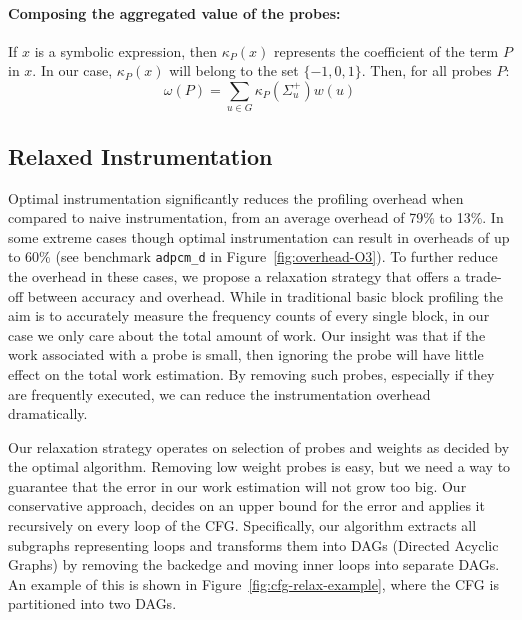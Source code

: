 \paragraph{Composing the aggregated value of the probes:}
If $x$ is a symbolic expression, then $\kappa_P(x)$ represents the coefficient
of the term $P$ in $x$.
In our case, $\kappa_P(x)$ will belong to the set $\{-1,0,1\}$.
Then, for all probes $P$:
\[
\omega(P) = \sum_{u\in G} \kappa_P(\Sigma^+_u)w(u)
\]

\subsection{Relaxed Instrumentation}

Optimal instrumentation significantly reduces the profiling overhead when compared to naive instrumentation, from an average overhead of
79\% to 13\%. In some extreme cases though optimal instrumentation can result in overheads of up to 60\% (see benchmark \texttt{adpcm\_d}
in Figure~\ref{fig:overhead-O3}). To further reduce the overhead in these cases, we propose a relaxation strategy that offers a trade-off
between accuracy and overhead. While in traditional basic block profiling the aim is to accurately measure the frequency counts of every
single block, in our case we only care about the total amount of work. Our insight was that if the work associated with a probe is small,
then ignoring the probe will have little effect on the total work estimation. By removing such probes, especially if they are frequently
executed, we can reduce the instrumentation overhead dramatically.

Our relaxation strategy operates on selection of probes and weights as decided by the optimal algorithm. Removing low weight probes is
easy, but we need a way to guarantee that the error in our work estimation will not grow too big. Our conservative approach, decides on an
upper bound for the error and applies it recursively on every loop of the CFG. Specifically, our algorithm extracts all subgraphs
representing loops and transforms them into DAGs (Directed Acyclic Graphs) by removing the backedge and moving inner loops into separate
DAGs. An example of this is shown in Figure~\ref{fig:cfg-relax-example}, where the CFG is partitioned into two DAGs.


